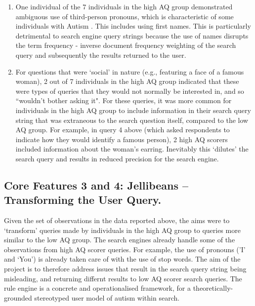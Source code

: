 \documentclass[a4paper, 11pt]{article}
\begin{document}
\begin{enumerate}
\item{One individual of the 7 individuals in the high AQ group demonstrated ambiguous use of third-person pronouns, which is characteristic of some individuals with Autism \cite{pronoun}. This includes using first names. This is particularly detrimental to search engine query strings because the use of names disrupts the term frequency - inverse document frequency weighting \cite{tfidf} of the search query and subsequently the results returned to the user.
}\label{pronoun}
 
\item{
For questions that were `social' in nature (e.g., featuring a face of a famous woman), 2 out of 7 individuals in the high AQ group indicated that these were types of queries that they would not normally be interested in, and so ``wouldn't bother asking it". For these queries, it was more common for individuals in the high AQ group to include information in their search query string that was extraneous to the search question itself, compared to the low AQ group. For example, in query 4 above (which asked respondents to indicate how they would identify a famous person), 2 high AQ scorers included information about the woman's earring. Inevitably this `dilutes' the search query and results in reduced precision for the search engine.
}

\end{enumerate}


\subsection{Core Features 3 and 4: Jellibeans -- Transforming the User Query.}
Given the set of observations in the data reported above, the aims were to `transform' queries made by individuals in the high AQ group to queries more similar to the low AQ group. The search engines already handle some of the observations from high AQ scorer queries. For example, the use of pronouns ('I' and `You') is already taken care of with the use of stop words. The aim of the project is to therefore address issues that result in the search query string being misleading, and returning differnt results to low AQ scorer search queries. The rule engine is a concrete and operationalised framework, for a theoretically-grounded stereotyped user model of autism within search. \\
\end{document}

